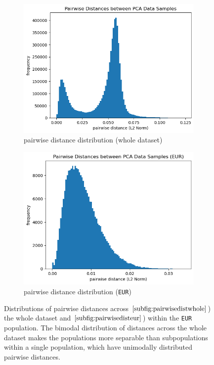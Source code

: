 \documentclass[11pt]{article}
\newcommand{\code}[1]{\texttt{#1}}
\theoremstyle{definition}
\begin{document}
\begin{figure}
    \begin{center}
        \begin{subfigure}[b]{0.45\textwidth}
            \centering
            \includegraphics[width=\textwidth]{img/snp_clustering_report_24_1.png}
            \caption{pairwise distance distribution (whole dataset)}
            \label{subfig:pairwisedistwhole}
        \end{subfigure}
        \begin{subfigure}[b]{0.45\textwidth}
            \centering
            \includegraphics[width=\textwidth]{img/snp_clustering_report_26_1.png}
            \caption{pairwise distance distribution (\code{EUR})}
            \label{subfig:pairwisedisteur}
        \end{subfigure}
    \end{center}
    \caption{Distributions of pairwise distances across $\ref{subfig:pairwisedistwhole}$) the whole dataset and $\ref{subfig:pairwisedisteur}$) within the \code{EUR} population. The bimodal distribution of distances across the whole dataset makes the populations more separable than subpopulations within a single population, which have unimodally distributed pairwise distances.}
\end{figure}
\label{fig:pairwisedist}
\end{document}
